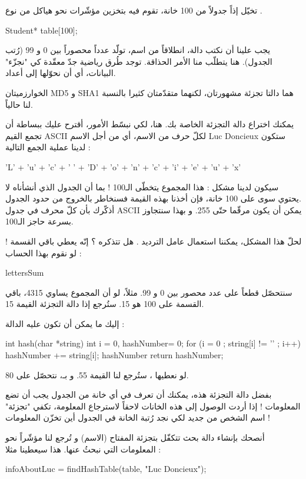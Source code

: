 تخيّل إذاً جدولاً من 100 خانة، تقوم فيه بتخزين مؤشّرات نحو هياكل من نوع
.

\begin{Csource}
Student* table[100];
\end{Csource}

يجب علينا أن نكتب دالة، انطلاقاً من اسم، تولّد عدداً محصوراً بين 0 و 99 (رُتب الجدول). هنا يتطلّب منا الأمر الحذاقة. توجد طُرق رياضية جدّ معقّدة كي "نجزّء" البيانات، أي أن نحوّلها إلى أعداد.

\begin{information}
الخوارزميتان
\textenglish{MD5}
و
\textenglish{SHA1}
هما دالتا تجزئة مشهورتان، لكنهما متقدّمتان كثيرا بالنسبة لنا حالياً.
\end{information}

يمكنك اختراع دالة التجزئة الخاصة بك. هنا، لكي نبسّط الأمور، أقترح عليك ببساطة أن تجمع القيم
\textenglish{ASCII}
لكلّ حرف من الاسم، أي من أجل الاسم
\textenglish{Luc Doncieux}
ستكون لدينا عملية الجمع التالية :

\begin{Csource}
'L' + 'u' + 'c' + ' ' + 'D' + 'o' + 'n' + 'c' + 'i' + 'e' + 'u' + 'x'
\end{Csource}

سيكون لدينا مشكل : هذا المجموع يتخطّى الـ100 ! بما أن الجدول الذي أنشأناه لا يحتوي سوى على 100 خانة، فإن أخذنا بهذه القيمة فسنخاطر بالخروج من حدود الجدول.\\
أذكّرك بأن كلّ محرف في جدول
\textenglish{ASCII}
يمكن أن يكون مرقّما حتّى 255. و بهذا سنتجاوز بسرعة حاجز الـ100.

لحلّ هذا المشكل، يمكننا استعمال عامل الترديد
\InlineCode{\%}.
هل تتذكره ؟ إنّه يعطي باقي القسمة ! لو نقوم بهذا الحساب :

\begin{Csource}
lettersSum %
\end{Csource}

سنتحصّل قطعاً على عدد محصور بين 0 و 99. مثلاً، لو أن المجموع يساوي 4315، باقي القسمة على 100 هو 15. ستُرجع إذا دالة التجزئة القيمة 15.

إليك ما يمكن أن تكون عليه الدالة :

\begin{Csource}
int hash(char *string)
{
	int i = 0, hashNumber= 0;
	for (i = 0 ; string[i] != '\0' ; i++)
	{
		hashNumber += string[i];
	}
	hashNumber %
	return hashNumber;
}
\end{Csource}

لو نعطيها
،
ستُرجع لنا القيمة 55. و بـ،
نتحصّل على 80.

بفضل دالة التجزئة هذه، يمكنك أن تعرف في أي خانة من الجدول يجب أن تضع المعلومات ! إذا أردت الوصول إلى هذه الخانات لاحقاً لاسترجاع المعلومة، تكفي "تجزئة" اسم الشخص من جديد لكي نجد رُتبة الخانة في الجدول أين تخزّن المعلومات !

أنصحك بإنشاء دالة بحث تتكفّل بتجزئة المفتاح (الاسم) و تُرجع لنا مؤشّراً نحو المعلومات التي نبحثُ عنها. هذا سيعطينا مثلا :

\begin{Csource}
infoAboutLuc = findHashTable(table, "Luc Doncieux");
\end{Csource}
